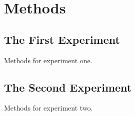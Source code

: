 \section{Methods}
\subsection{The First Experiment}
Methods for experiment one.
\subsection{The Second Experiment}
Methods for experiment two.
